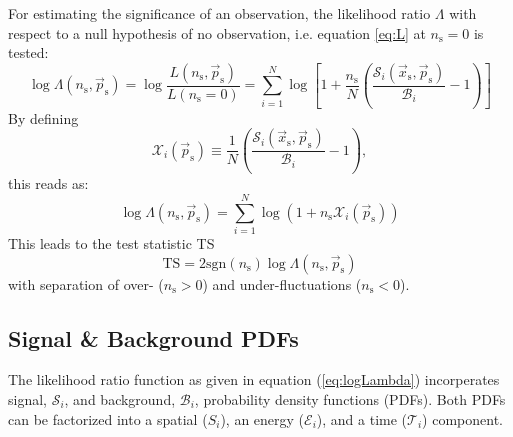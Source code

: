 \documentclass{article}
\newcommand{\eq}[1]{(\ref{#1})}
\newcommand{\ns}{n_{\mathrm{s}}}
\newcommand{\ps}{\vec{p}_{\mathrm{s}}}
\newcommand{\xs}{\vec{x}_{\mathrm{s}}}
\begin{document}
For estimating the significance of an observation, the likelihood ratio
$\Lambda$ with respect to a null hypothesis of no observation, i.e.
equation \ref{eq:L} at $\ns=0$ is tested:
\begin{equation}
 \log \Lambda(\ns,\ps) = \log \frac{L(\ns,\ps)}{L(\ns=0)} = \sum_{i=1}^{N} \log \left[ 1 + \frac{\ns}{N}\left( \frac{\mathcal{S}_i(\xs,\ps)}{\mathcal{B}_i} - 1 \right) \right]
\label{eq:logLambda}
\end{equation}
By defining
\begin{equation}
\mathcal{X}_i(\ps) \equiv \frac{1}{N}\left( \frac{\mathcal{S}_i(\xs,\ps)}{\mathcal{B}_i} - 1 \right),
\label{eq:Xi}
\end{equation}
this reads as:
\begin{equation}
 \log \Lambda(\ns,\ps) = \sum_{i=1}^{N} \log (1 + \ns\mathcal{X}_i(\ps))
 \label{eq:logLambdaOfX}
\end{equation}
This leads to the test statistic TS
\begin{equation}
 \mathrm{TS} = 2\mathrm{sgn}(\ns) \log \Lambda(\ns,\ps)
 \label{eq:TS}
\end{equation}
with separation of over- ($\ns > 0$) and under-fluctuations ($\ns < 0$).

\subsection{Signal \& Background PDFs}

The likelihood ratio function as given in equation \eq{eq:logLambda}
incorperates signal, $\mathcal{S}_i$, and background, $\mathcal{B}_i$,
probability density functions (PDFs). Both PDFs can be factorized into a
spatial ($S_i$), an energy ($\mathcal{E}_i$), and a time ($\mathcal{T}_i$)
component.
\end{document}

